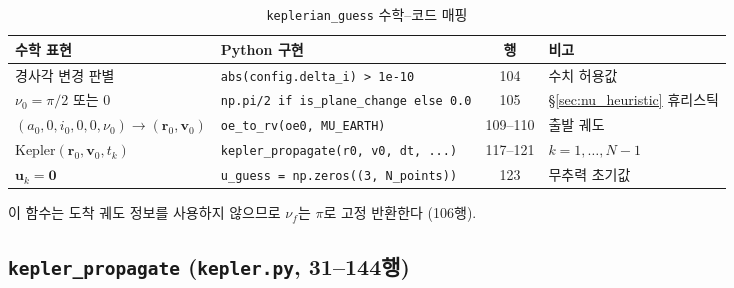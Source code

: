 \documentclass[11pt]{article}
\begin{document}
\begin{table}[htbp]
\centering
\caption{\texttt{keplerian\_guess} 수학--코드 매핑}
\label{tab:keplerian_mapping}
\small
\begin{tabular}{@{}llcl@{}}
\toprule
수학 표현 & Python 구현 & 행 & 비고 \\
\midrule
경사각 변경 판별 & \texttt{abs(config.delta\_i) > 1e-10} & 104 & 수치 허용값 \\
$\nu_0 = \pi/2$ 또는 $0$ & \texttt{np.pi/2 if is\_plane\_change else 0.0} & 105 & \S\ref{sec:nu_heuristic} 휴리스틱 \\
$(a_0, 0, i_0, 0, 0, \nu_0) \to (\mathbf{r}_0, \mathbf{v}_0)$ & \texttt{oe\_to\_rv(oe0, MU\_EARTH)} & 109--110 & 출발 궤도 \\
$\text{Kepler}(\mathbf{r}_0, \mathbf{v}_0, t_k)$ & \texttt{kepler\_propagate(r0, v0, dt, ...)} & 117--121 & $k=1,\ldots,N{-}1$ \\
$\mathbf{u}_k = \mathbf{0}$ & \texttt{u\_guess = np.zeros((3, N\_points))} & 123 & 무추력 초기값 \\
\bottomrule
\end{tabular}
\end{table}

이 함수는 도착 궤도 정보를 사용하지 않으므로 $\nu_f$는 $\pi$로 고정 반환한다 (106행).


\subsection{\texttt{kepler\_propagate} (\texttt{kepler.py}, 31--144행)}
\label{sec:impl_kepler}
\end{document}
